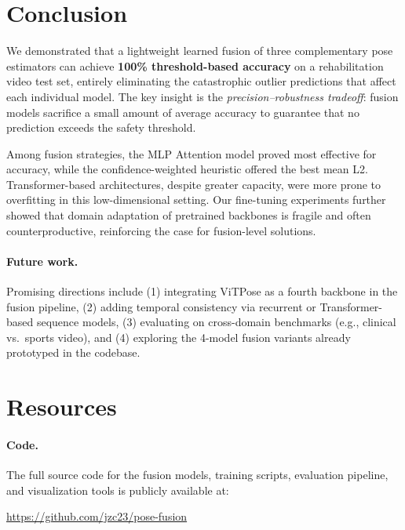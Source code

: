 \documentclass[11pt,a4paper]{article}
\begin{document}
\section{Conclusion}\label{sec:conclusion}

We demonstrated that a lightweight learned fusion of three complementary pose
estimators can achieve \textbf{100\% threshold-based accuracy} on a
rehabilitation video test set, entirely eliminating the catastrophic outlier
predictions that affect each individual model.  The key insight is the
\emph{precision--robustness tradeoff}: fusion models sacrifice a small amount
of average accuracy to guarantee that no prediction exceeds the safety
threshold.

Among fusion strategies, the MLP Attention model proved most effective for
accuracy, while the confidence-weighted heuristic offered the best mean L2.
Transformer-based architectures, despite greater capacity, were more prone to
overfitting in this low-dimensional setting.  Our fine-tuning experiments
further showed that domain adaptation of pretrained backbones is fragile and
often counterproductive, reinforcing the case for fusion-level solutions.
\paragraph{Future work.}
Promising directions include (1) integrating ViTPose as a fourth backbone in
the fusion pipeline, (2) adding temporal consistency via recurrent or
Transformer-based sequence models, (3) evaluating on cross-domain benchmarks
(e.g., clinical vs.\ sports video), and (4) exploring the 4-model fusion
variants already prototyped in the codebase.

\section{Resources}\label{sec:resources}

\paragraph{Code.}
The full source code for the fusion models, training scripts, evaluation
pipeline, and visualization tools is publicly available at:

\begin{center}
\url{https://github.com/jzc23/pose-fusion}
\end{center}
\end{document}
